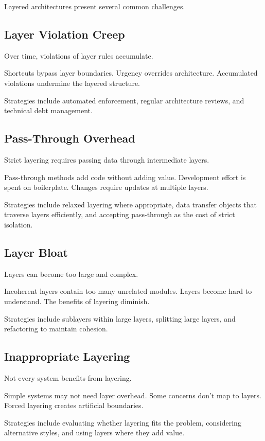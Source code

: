 \documentclass[11pt]{article}
\begin{document}
Layered architectures present several common challenges.

\subsection{Layer Violation Creep}

Over time, violations of layer rules accumulate.

Shortcuts bypass layer boundaries. Urgency overrides architecture. Accumulated violations undermine the layered structure.

Strategies include automated enforcement, regular architecture reviews, and technical debt management.

\subsection{Pass-Through Overhead}

Strict layering requires passing data through intermediate layers.

Pass-through methods add code without adding value. Development effort is spent on boilerplate. Changes require updates at multiple layers.

Strategies include relaxed layering where appropriate, data transfer objects that traverse layers efficiently, and accepting pass-through as the cost of strict isolation.

\subsection{Layer Bloat}

Layers can become too large and complex.

Incoherent layers contain too many unrelated modules. Layers become hard to understand. The benefits of layering diminish.

Strategies include sublayers within large layers, splitting large layers, and refactoring to maintain cohesion.

\subsection{Inappropriate Layering}

Not every system benefits from layering.

Simple systems may not need layer overhead. Some concerns don't map to layers. Forced layering creates artificial boundaries.

Strategies include evaluating whether layering fits the problem, considering alternative styles, and using layers where they add value.
\end{document}

